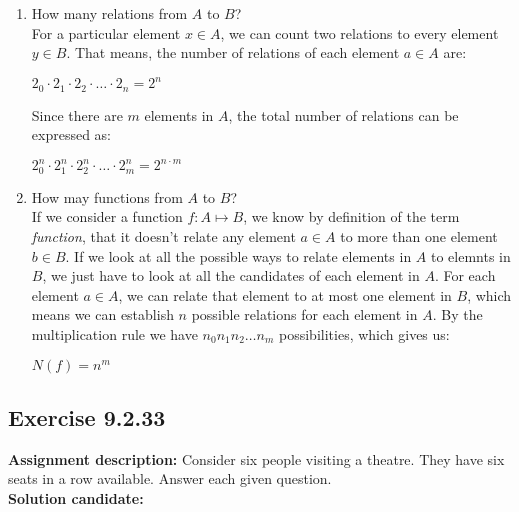 \documentclass{report}
\newcommand{\cent}[1]{\begin{center}#1\end{center}}
\newcommand{\In}{\! \in \!}
\newcommand{\assignmentDescription}{\textbf{Assignment description: }}
\newcommand{\solution}{\textbf{Solution candidate: }}
\newcommand{\Exercise}[1]{\subsection{Exercise #1}}
\newcommand{\defaultEnumerateLabel}{\textbf{\alph*.}}
\newcommand{\myItem}[1]{\item #1\\}
\begin{document}
 	\begin{enumerate}[label=\defaultEnumerateLabel]
 		\myItem{How many relations from $A$ to $B$?}
 		
 		For a particular element $x \In A$, we can count two relations to every element $y \In B$. That means, the number of relations of each element $a \In A$ are:
 		
 		\cent{$2_0 \cdot 2_1 \cdot 2_2 \cdot \dots \cdot 2_n = 2^n$}
 		
 		
 		Since there are $m$ elements in $A$, the total number of relations can be expressed as:
 		
 		\cent{$2_0^n \cdot 2_1^n \cdot 2_2^n \cdot \dots \cdot 2_m^n = 2^{n \cdot m}$}
 		
 		\myItem{How may functions from $A$ to $B$?}
 		
 		If we consider a function $f : A \mapsto B$, we know by definition of the term \textit{function}, that it doesn't relate any element $a \In A$ to more than one element $b \In B$. If we look at all the possible ways to relate  elements in $A$ to elemnts in $B$, we just have to look at all the candidates of each element in $A$. For each element $a \In A$, we can relate that element to at most one element in $B$, which means we can establish $n$ possible relations for each element in $A$. By the multiplication rule we have $n_0 n_1 n_2 \dots n_m$ possibilities, which gives us:
 		
 		\cent{$N(f) = n^m$}
 		
 	\end{enumerate} 
 	
 	
 	\Exercise{9.2.33}
 	
 	\assignmentDescription
 	Consider six people visiting a theatre.  They have six seats in a row available. Answer each given question.\\
 	
 	\solution
 	
\end{document}
